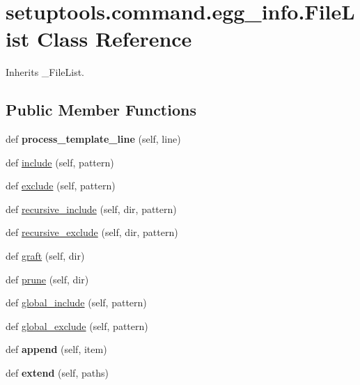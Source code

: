 \hypertarget{classsetuptools_1_1command_1_1egg__info_1_1_file_list}{}\section{setuptools.\+command.\+egg\+\_\+info.\+File\+List Class Reference}
\label{classsetuptools_1_1command_1_1egg__info_1_1_file_list}


Inherits \+\_\+\+File\+List.

\subsection*{Public Member Functions}
\begin{DoxyCompactItemize}
\item 
\mbox{\label{classsetuptools_1_1command_1_1egg__info_1_1_file_list_a4c2fa3fbb3484337650be82c173d06bf}} 
def {\bfseries process\+\_\+template\+\_\+line} (self, line)
\item 
def \hyperlink{classsetuptools_1_1command_1_1egg__info_1_1_file_list_ae1210c8390f0b9722db42fb320e1eb05}{include} (self, pattern)
\item 
def \hyperlink{classsetuptools_1_1command_1_1egg__info_1_1_file_list_a4ceece8c1628a9e1dfc346f597236ea6}{exclude} (self, pattern)
\item 
def \hyperlink{classsetuptools_1_1command_1_1egg__info_1_1_file_list_a287e9bf1901bbc7fe07e6018227e8493}{recursive\+\_\+include} (self, dir, pattern)
\item 
def \hyperlink{classsetuptools_1_1command_1_1egg__info_1_1_file_list_adf73c4c0b091249abfe3f353b3c5e31b}{recursive\+\_\+exclude} (self, dir, pattern)
\item 
def \hyperlink{classsetuptools_1_1command_1_1egg__info_1_1_file_list_a3a7407577c491ca328677532b0a67264}{graft} (self, dir)
\item 
def \hyperlink{classsetuptools_1_1command_1_1egg__info_1_1_file_list_aeca88a33bf21b70a8d6adec507704468}{prune} (self, dir)
\item 
def \hyperlink{classsetuptools_1_1command_1_1egg__info_1_1_file_list_a37479fbd5d06a6abedea2c8914754735}{global\+\_\+include} (self, pattern)
\item 
def \hyperlink{classsetuptools_1_1command_1_1egg__info_1_1_file_list_af536ad4a0fc2c5a6f2499255a50429ed}{global\+\_\+exclude} (self, pattern)
\item 
\mbox{\label{classsetuptools_1_1command_1_1egg__info_1_1_file_list_a8f5c1a299b05cc91a266116514a841c5}} 
def {\bfseries append} (self, item)
\item 
\mbox{\label{classsetuptools_1_1command_1_1egg__info_1_1_file_list_a1fc25e5103545c7a0fbb613b72cc89e6}} 
def {\bfseries extend} (self, paths)
\end{DoxyCompactItemize}
